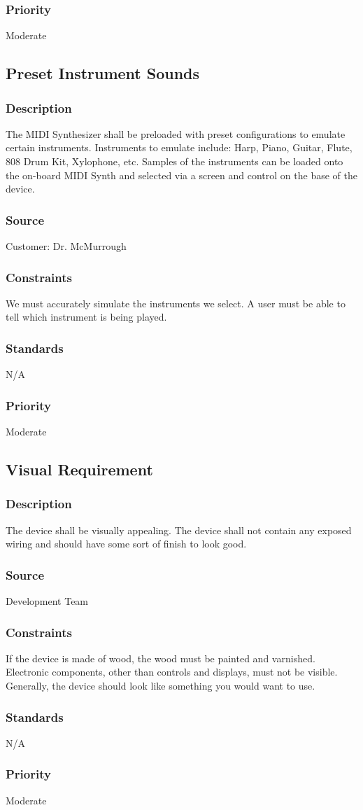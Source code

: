 \subsubsection{Priority}
Moderate

\subsection{Preset Instrument Sounds}
\subsubsection{Description}
The MIDI Synthesizer shall be preloaded with preset configurations to emulate certain instruments. Instruments to emulate include: Harp, Piano, Guitar, Flute, 808 Drum Kit, Xylophone, etc. Samples of the instruments can be loaded onto the on-board MIDI Synth and selected via a screen and control on the base of the device.
\subsubsection{Source}
Customer: Dr. McMurrough
\subsubsection{Constraints}
We must accurately simulate the instruments we select. A user must be able to tell which instrument is being played.
\subsubsection{Standards}
N/A
\subsubsection{Priority}
Moderate

\subsection{Visual Requirement}
\subsubsection{Description}
The device shall be visually appealing. The device shall not contain any exposed wiring and should have some sort of finish to look good. 
\subsubsection{Source}
Development Team
\subsubsection{Constraints}
If the device is made of wood, the wood must be painted and varnished. Electronic components, other than controls and displays, must not be visible. Generally, the device should look like something you would want to use.
\subsubsection{Standards}
N/A
\subsubsection{Priority}
Moderate
